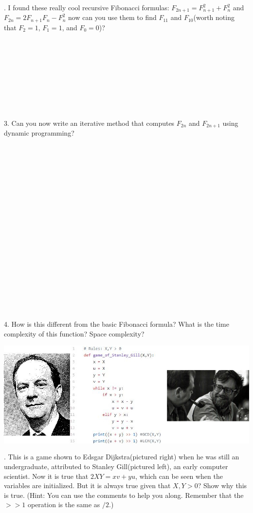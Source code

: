 \documentclass[12pt]{article}
\begin{document}
. I found these really cool recursive Fibonacci formulas: 
$F_{2n+1}=F_{n+1}^{2}+F_{n}^{2}$ and $F_{2n}=2F_{n+1}F_{n}-F_{n}^2$
 now can you use them to find $F_{11}$ and $F_{10}$(worth noting that
 $F_2 = 1$, $F_1 = 1$, and $F_0 = 0$)?\\\\\\\\\\\\\\\\\\\\
 3. Can you now write an iterative method that computes $F_{2n}$ and $F_{2n+1}$
 using dynamic programming?\\\\\\\\\\\\\\\\\\\\\\\\\\\\\\\\\\\\\\\\
 4. How is this different from the basic Fibonacci formula? What is the
 time complexity of this function? Space complexity?
    \FloatBarrier
\newpage
\centerline{\includegraphics[scale = 2]{comb.jpg}}
. This is a game shown to Edsgar Dijkstra(pictured right) when he was still an undergraduate, attributed to Stanley Gill(pictured left), an early computer scientist. Now it is true that $2XY = xv+yu$, which can be seen when the variables are initialized. But it is always true given that $X,Y > 0$? Show why this is true. (Hint: You can use the comments to help you along. Remember that the $>> 1 $ operation is the same as $ / 2$.)
\end{document}
